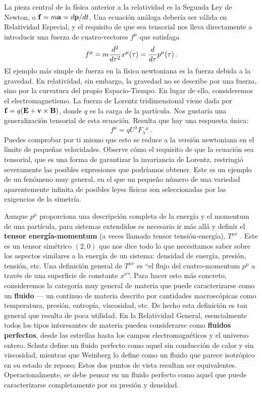 \documentclass[11pt,b5paper,openany,twoside]{book}
\newcommand{\mn}{{\mu\nu}}
\begin{document}
La pieza central de la física anterior a la relatividad es la Segunda Ley de Newton, o ${\bf f}=m{\bf a} = d{\bf p}/dt$.
Una ecuación análoga debería ser válida en Relatividad Especial, y el requisito de que sea tensorial nos lleva directamente a introducir una fuerza de cuatro-vectores $f^\mu$ que satisfaga
\begin{equation}
f^\mu = m{{d^2}\over{d\tau^2}}x^\mu(\tau) = {{d}\over{d\tau}}
p^\mu(\tau)\,.\label{1.102}
\end{equation}
El ejemplo más simple de fuerza en la física newtoniana es la fuerza debida a la gravedad.
En relatividad, sin embargo, la gravedad no se describe por una fuerza, sino por la curvatura del propio Espacio-Tiempo.
En lugar de ello, consideremos el electromagnetismo.
La fuerza de Lorentz tridimensional viene dada por ${\bf f} = q({\bf E} + {\bf v}\times{\bf B})$, donde $q$ es la carga de la partícula.
Nos gustaría una generalización tensorial de esta ecuación.
Resulta que hay una respuesta única:
\begin{equation}
f^\mu = qU^\lambda F_\lambda{}^\mu\,.\label{1.103}
\end{equation}
Puedes comprobar por ti mismo que esto se reduce a la versión newtoniana en el límite de pequeñas velocidades.
Observe cómo el requisito de que la ecuación sea tensorial, que es una forma de garantizar la invariancia de Lorentz, restringió severamente las posibles expresiones que podríamos obtener.
Este es un ejemplo de un fenómeno muy general, en el que un pequeño número de una variedad aparentemente infinita de posibles leyes físicas son seleccionadas por las exigencias de la simetría.

Aunque $p^\mu$ proporciona una descripción completa de la energía y el momentum de una partícula, para sistemas extendidos es necesario ir más allá y definir el {\bf tensor energía-momentum} (a veces llamado tensor tensión-energía), $T^\mn$ .
Este es un tensor simétrico $(2,0)$ que nos dice todo lo que necesitamos saber sobre los aspectos similares a la energía de un sistema: densidad de energía, presión, tensión, etc.
Una definición general de $T^\mn$ es ``el flujo del cuatro-momentum $p^\mu$ a través de una superficie de constante $x^\nu$''.
Para hacer esto más concreto, consideremos la categoría muy general de materia que puede caracterizarse como un {\bf fluido} --- un continuo de materia descrito por cantidades macroscópicas como temperatura, presión, entropía, viscosidad, etc.
De hecho esta definición es tan general que resulta de poca utilidad.
En la Relatividad General, esencialmente todos los tipos interesantes de materia pueden considerarse como {\bf fluidos perfectos}, desde las estrellas hasta los campos electromagnéticos y el universo entero.
Schutz define un fluido perfecto como aquel sin conducción de calor y sin viscosidad, mientras que Weinberg lo define como un fluido que parece isotrópico en su estado de reposo; Estos dos puntos de vista resultan ser equivalentes.
Operacionalmente, se debe pensar en un fluido perfecto como aquel que puede caracterizarse completamente por su presión y densidad.
\end{document}
